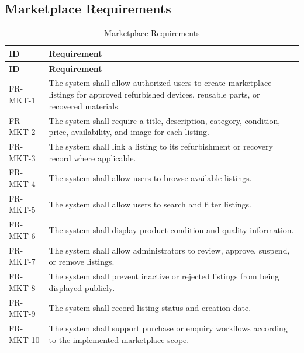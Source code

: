 \subsection{Marketplace Requirements}
\begin{longtable}{@{}p{2.4cm}p{11cm}@{}}
\caption{Marketplace Requirements} \label{tab:fr-mkt} \\
\toprule \textbf{ID} & \textbf{Requirement} \\ \midrule
\endfirsthead
\toprule \textbf{ID} & \textbf{Requirement} \\ \midrule
\endhead
FR-MKT-1 & The system shall allow authorized users to create marketplace listings for approved refurbished devices, reusable parts, or recovered materials. \\
FR-MKT-2 & The system shall require a title, description, category, condition, price, availability, and image for each listing. \\
FR-MKT-3 & The system shall link a listing to its refurbishment or recovery record where applicable. \\
FR-MKT-4 & The system shall allow users to browse available listings. \\
FR-MKT-5 & The system shall allow users to search and filter listings. \\
FR-MKT-6 & The system shall display product condition and quality information. \\
FR-MKT-7 & The system shall allow administrators to review, approve, suspend, or remove listings. \\
FR-MKT-8 & The system shall prevent inactive or rejected listings from being displayed publicly. \\
FR-MKT-9 & The system shall record listing status and creation date. \\
FR-MKT-10 & The system shall support purchase or enquiry workflows according to the implemented marketplace scope. \\
\bottomrule
\end{longtable}

